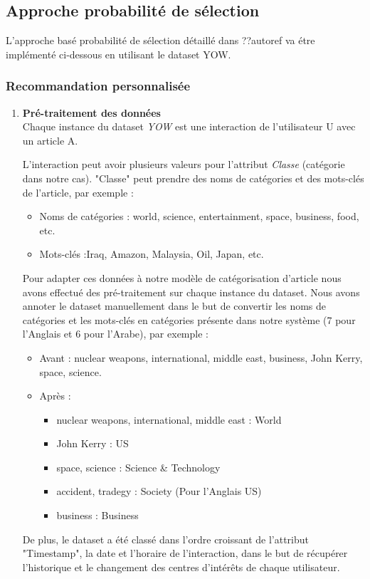     \subsection{Approche probabilité de sélection}  
    L'approche basé probabilité de sélection détaillé dans ??autoref{} va étre implémenté ci-dessous en utilisant le dataset \textquotedbl YOW\textquotedbl.
        \subsubsection{Recommandation personnalisée}
        \begin{enumerate}[leftmargin=*]
            \item\textbf{Pré-traitement des données}\\
            Chaque instance du dataset \emph{YOW} est une interaction de l'utilisateur U avec un article A.

            L'interaction peut avoir plusieurs valeurs pour l'attribut \emph{Classe} (catégorie dans notre cas). "Classe" peut prendre des noms de catégories et des mots-clés de l'article, par exemple :
            \begin{itemize}
                \item Noms de catégories : world, science, entertainment, space, business, food, etc.
                \item Mots-clés :Iraq, Amazon, Malaysia, Oil, Japan, etc.\\ 
            \end{itemize}
            Pour adapter ces données à notre modèle de catégorisation d'article nous avons effectué des pré-traitement sur chaque instance du dataset. Nous avons annoter le dataset manuellement dans le but de convertir les noms de catégories et les mots-clés en catégories présente dans notre système (7 pour l'Anglais et 6 pour l'Arabe), par exemple :
            \begin{itemize}
                \item Avant : nuclear weapons, international, middle east, business, John Kerry, space, science.
                \item Après :
                \begin{itemize}
                    \item {nuclear weapons, international, middle east} : World
                    \item {John Kerry} : US
                    \item {space, science} : Science \& Technology
                    \item {accident, tradegy} : Society (Pour l'Anglais US)
                    \item {business} : Business\\
                \end{itemize}    
            \end{itemize}
            De plus, le dataset a été classé dans l'ordre croissant de l'attribut "Timestamp", la date et l'horaire de l'interaction, dans le but de récupérer l'historique et le changement des centres d’intérêts de chaque utilisateur. 


\end{enumerate}
